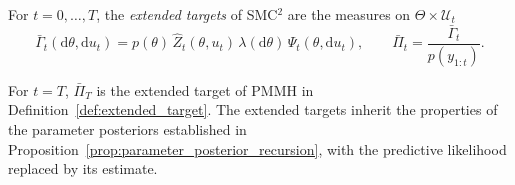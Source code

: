\begin{definition}
    \label{def:smc2_extended_targets}
    For $t=0,\ldots,T$, the \emph{extended targets} of SMC$^2$ are the measures on $\Theta\times\mathcal{U}_t$
    \begin{equation}
        \bar{\Gamma}_t(\mathrm{d}\theta,\mathrm{d}u_t) = p(\theta)\,\hat{Z}_t(\theta,u_t)\,\lambda(\mathrm{d}\theta)\,\Psi_t(\theta,\mathrm{d}u_t), \qquad
        \bar{\Pi}_t = \frac{\bar{\Gamma}_t}{p(y_{1:t})}.
    \end{equation}
\end{definition}

For $t=T$, $\bar{\Pi}_T$ is the extended target of PMMH in Definition~\ref{def:extended_target}. The extended targets inherit the properties of the parameter posteriors established in Proposition~\ref{prop:parameter_posterior_recursion}, with the predictive likelihood replaced by its estimate.

